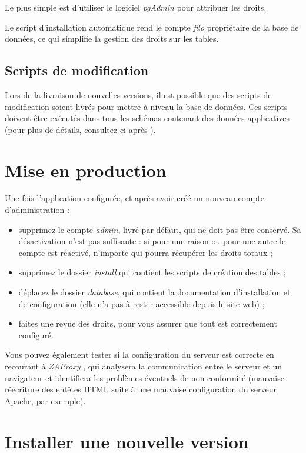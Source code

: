 Le plus simple est d'utiliser le logiciel \textit{pgAdmin} \cite{pgadmin} pour attribuer les droits.

Le script d'installation automatique rend le compte \textit{filo} propriétaire de la base de données, ce qui simplifie la gestion des droits sur les tables.

\subsection{Scripts de modification}

Lors de la livraison de nouvelles versions, il est possible que des scripts de modification soient livrés pour mettre à niveau la base de données. Ces scripts doivent être exécutés dans tous les schémas contenant des données applicatives (pour plus de détails, consultez ci-après \textit{}).

\section{Mise en production}

Une fois l'application configurée, et après avoir créé un nouveau compte d'administration :
\begin{itemize}
\item supprimez le compte \textit{admin}, livré par défaut, qui ne doit pas être conservé. Sa désactivation n'est pas suffisante : si pour une raison ou pour une autre le compte est réactivé, n'importe qui pourra récupérer les droits totaux ;
\item supprimez le dossier \textit{install} qui contient les scripts de création des tables ;
\item déplacez le dossier \textit{database}, qui contient la documentation d'installation et de configuration (elle n'a pas à rester accessible depuis le site web) ;
\item faites une revue des droits, pour vous assurer que tout est correctement configuré.
\end{itemize}

Vous pouvez également tester si la configuration du serveur est correcte en recourant à \textit{ZAProxy} \cite{zaproxy}, qui analysera la communication entre le serveur et un navigateur et identifiera les problèmes éventuels de non conformité (mauvaise réécriture des entêtes HTML suite à une mauvaise configuration du serveur Apache, par exemple).

\section{Installer une nouvelle version}
\label{newVersion}

